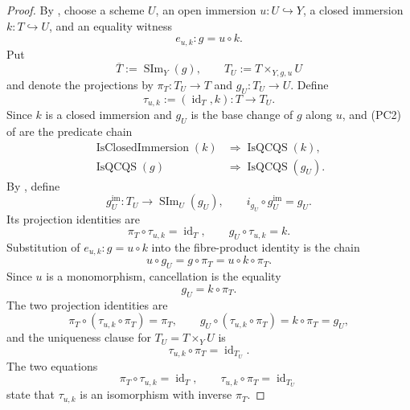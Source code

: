 \begin{proof}
  By \cite[Tag 01RG]{stacks-project}, choose a scheme $U$, an open
  immersion $u\colon U\hookrightarrow Y$, a closed immersion
  $k\colon T\hookrightarrow U$, and an equality witness
  \[
    e_{u,k}\colon g=u\circ k.
  \]
  Put
  \[
    \overline T:=\operatorname{SIm}_Y(g),
    \qquad
    T_U:=T\times_{Y,g,u}U
  \]
  and denote the projections by
  $\pi_T\colon T_U\to T$ and $g_U\colon T_U\to U$.  Define
  \[
    \tau_{u,k}:=(\operatorname{id}_T,k)\colon T\longrightarrow T_U.
  \]
  Since $k$ is a closed immersion and $g_U$ is the base change of $g$ along
  $u$,  and (PC2) of
   are the predicate chain
  \[
  \begin{aligned}
    \operatorname{IsClosedImmersion}(k)
      &\Longrightarrow\operatorname{IsQCQS}(k),\\
    \operatorname{IsQCQS}(g)
      &\Longrightarrow\operatorname{IsQCQS}(g_U).
  \end{aligned}                                                     \tag{IO-2}
  \]
  By , define
  \[
    g_U^{\mathrm{im}}\colon T_U\to\operatorname{SIm}_U(g_U),
    \qquad i_{g_U}\circ g_U^{\mathrm{im}}=g_U.                    \tag{IO-3}
  \]
  Its projection identities are
  \[
    \pi_T\circ\tau_{u,k}=\operatorname{id}_T,
    \qquad
    g_U\circ\tau_{u,k}=k.
  \]
  Substitution of $e_{u,k}\colon g=u\circ k$ into the fibre-product identity
  is the chain
  \[
    u\circ g_U
      =g\circ\pi_T
      =u\circ k\circ\pi_T.
  \]
  Since $u$ is a monomorphism, cancellation is the equality
  \[
    g_U=k\circ\pi_T.
  \]
  The two projection identities are
  \[
    \pi_T\circ(\tau_{u,k}\circ\pi_T)=\pi_T,
    \qquad
    g_U\circ(\tau_{u,k}\circ\pi_T)
      =k\circ\pi_T=g_U,
  \]
  and the uniqueness clause for $T_U=T\times_YU$ is
  \[
    \tau_{u,k}\circ\pi_T=\operatorname{id}_{T_U}.
  \]
  The two equations
  \[
    \pi_T\circ\tau_{u,k}=\operatorname{id}_T,
    \qquad
    \tau_{u,k}\circ\pi_T=\operatorname{id}_{T_U}
  \]
  state that $\tau_{u,k}$ is an isomorphism with inverse $\pi_T$.


\end{proof}

